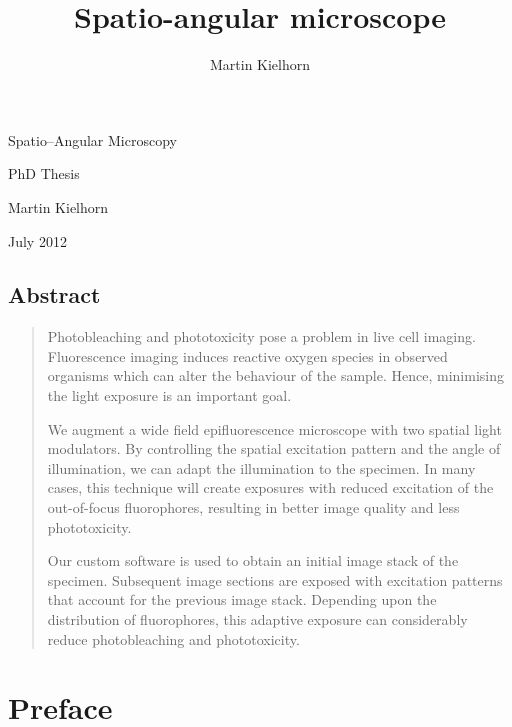 \documentclass[oneside,a4paper,12pt,BCOR20mm,DIV14]{scrbook} %
\title{Spatio-angular microscope} %
\author{Martin Kielhorn}
\def\svgending{\ifx\pdfoutput\undefined%
  .eps_tex%
  \else%
  .pdf_tex%
  \fi}
\newcommand{\svginput}[2]{{\def\svgscale{#1}}}
\newenvironment{summary}{\begin{quote}\small}{\end{quote}}
\begin{document}
\listoftodos
\begin{titlepage}
  
  \hspace{-4cm}
  \svginput{1}{objective-trace}



  \vspace{-5cm}
  
  \hspace{4cm}\textsf{\Huge Spatio--Angular Microscopy}
  
  \vspace{2cm}
  \hspace{6cm}\textsf{\huge PhD Thesis}


  \vspace{3cm}
  \hspace{4cm}\textsf{\Large Martin Kielhorn}
  
  \vspace{1cm}
  \hspace{4cm}\textsf{\Large July 2012}
\end{titlepage}
\newpage
%
\section*{Abstract}
\begin{summary}
  Photobleaching and phototoxicity pose a problem in live cell
  imaging. Fluorescence imaging induces reactive oxygen species in
  observed organisms which can alter the behaviour of the
  sample. Hence, minimising the light exposure is an important goal.

  We augment a wide field epifluorescence microscope with two spatial
  light modulators. By controlling the spatial excitation pattern and
  the angle of illumination, we can adapt the illumination to the
  specimen. In many cases, this technique will create exposures with
  reduced excitation of the out-of-focus fluorophores, resulting in
  better image quality and less phototoxicity.

  Our custom software is used to obtain an initial image stack of the
  specimen. Subsequent image sections are exposed with excitation
  patterns that account for the previous image stack. Depending
  upon the distribution of fluorophores, this adaptive exposure can
  considerably reduce photobleaching and phototoxicity.
\end{summary}


\chapter*{Preface}
\end{document}
